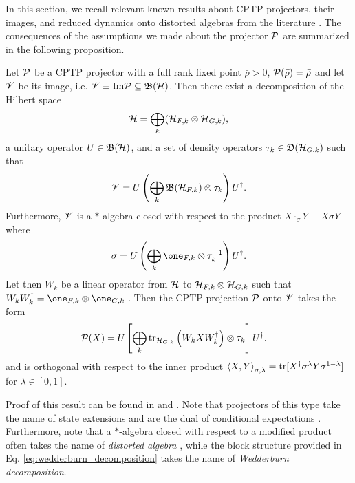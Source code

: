 \documentclass[10pt,aps,pra,twocolumn,showpacs,superscriptaddress,nobalancelastpage,notitlepage,nofootinbib,longbibliography]{revtex4-2}
\begin{document}
In this section, we recall relevant known results about CPTP projectors, their images, and reduced dynamics onto distorted algebras from the literature \cite{lindblad1999general, wolf2012quantum, ticozzi2017alternating, bialonczyk2018application, blume2010information,grigoletto2024exact,wolf2010inverseeigenvalueproblemquantum}. The consequences of the assumptions we made about the projector $\mathcal{P}$ are summarized in the following proposition. 
\begin{proposition}
\label{prop:structure_of_fixed_points}
    Let $\mathcal{P}$ be a CPTP projector with a full rank fixed point $\bar{\rho}>0$, $\mathcal{P}(\bar{\rho})=\bar{\rho}$ and let $\mathscr{V}$ be its image, i.e. $ \mathscr{V} \equiv {\rm Im}\mathcal{P} \subseteq\mathfrak{B}(\mathcal{H})$. 
    Then there exist a decomposition of the Hilbert space \[\mathcal{H} = \bigoplus_k (\mathcal{H}_{F,k}\otimes\mathcal{H}_{G,k}),\] a unitary operator $U\in\mathfrak{B}(\mathcal{H})$, and a set of density operators $\tau_k\in\mathfrak{D}(\mathcal{H}_{G,k})$ such that 
    \begin{equation}
        \mathscr{V} = U\left(\bigoplus_k \mathfrak{B}(\mathcal{H}_{F,k}) \otimes \tau_k  \right) U^\dag.
        \label{eq:wedderburn_decomposition}
    \end{equation}
    Furthermore, $\mathscr{V}$ is a $*$-algebra closed with respect to the product $X\cdot_\sigma Y \equiv X \sigma Y$ where \[\sigma = U\left(\bigoplus_k\one_{F,k}\otimes \tau_k^{-1}\right)U^\dag.\]  
    Let then $W_k$ be a linear operator from $\mathcal{H}$ to $\mathcal{H}_{F,k}\otimes\mathcal{H}_{G,k}$ such that $W_k W_k^\dag=\one_{F,k}\otimes \one_{G,k}$ \cite{wolf2012quantum}. Then the CPTP projection $\mathcal{P}$ onto $\mathscr{V}$ takes the form
    \begin{align}
         \mathcal{P}(X) 
            &= U\left[ \bigoplus_{k} {\rm tr}_{\mathcal{H}_{G,k}}\left(W_k X W_k^\dag \right)\otimes \tau_k  \right] U^\dag.
        \label{eqn:state_ext_blocks}
    \end{align}
    and is orthogonal with respect to the inner product $\left< X,Y \right>_{\sigma,\lambda} = {\rm tr}[X^\dag \sigma^\lambda Y \sigma^{1-\lambda}]$ for $\lambda\in[0,1]$.
\end{proposition}
Proof of this result can be found in \cite{lindblad1999general} and \cite{wolf2010inverseeigenvalueproblemquantum,wolf2012quantum,tit2023, ticozzi2017alternating, johnson2015general}. Note that projectors of this type take the name of state extensions and are the dual of conditional expectations \cite{petz2007quantum,blackadar2006operator}. Furthermore, note that a $*$-algebra closed with respect to a modified product often takes the name of \textit{distorted algebra} \cite{blume2010information}, while the block structure provided in Eq. \eqref{eq:wedderburn_decomposition} takes the name of \textit{Wedderburn decomposition}. 
\end{document}
